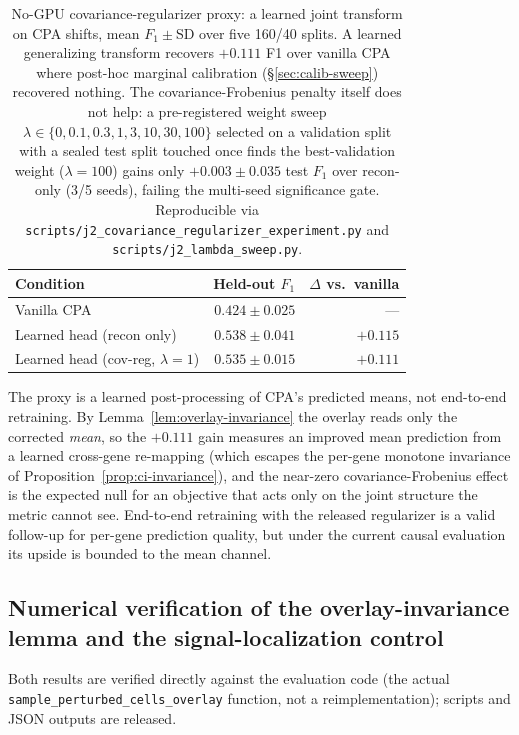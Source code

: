 \documentclass{article}
\theoremstyle{plain}
\theoremstyle{definition}
\theoremstyle{remark}
\begin{document}
\begin{table}[h]
\centering
\small
\begin{tabular}{lrr}
\toprule
\textbf{Condition} & \textbf{Held-out $F_1$} & \textbf{$\Delta$ vs.\ vanilla} \\
\midrule
Vanilla CPA              & $0.424 \pm 0.025$ & --- \\
Learned head (recon only) & $0.538 \pm 0.041$ & $+0.115$ \\
Learned head (cov-reg, $\lambda{=}1$) & $0.535 \pm 0.015$ & $+0.111$ \\
\bottomrule
\end{tabular}
\caption{No-GPU covariance-regularizer proxy: a learned joint transform on CPA shifts, mean $F_1\pm$SD over five 160/40 splits. A learned generalizing transform recovers $+0.111$ F1 over vanilla CPA where post-hoc marginal calibration (\S\ref{sec:calib-sweep}) recovered nothing. The covariance-Frobenius penalty itself does not help: a pre-registered weight sweep $\lambda\in\{0,0.1,0.3,1,3,10,30,100\}$ selected on a validation split with a sealed test split touched once finds the best-validation weight ($\lambda{=}100$) gains only $+0.003\pm0.035$ test $F_1$ over recon-only (3/5 seeds), failing the multi-seed significance gate. Reproducible via \texttt{scripts/j2\_covariance\_regularizer\_experiment.py} and \texttt{scripts/j2\_lambda\_sweep.py}.}
\label{tab:j2}
\end{table}

The proxy is a learned post-processing of CPA's predicted means, not end-to-end retraining. By Lemma~\ref{lem:overlay-invariance} the overlay reads only the corrected \emph{mean}, so the $+0.111$ gain measures an improved mean prediction from a learned cross-gene re-mapping (which escapes the per-gene monotone invariance of Proposition~\ref{prop:ci-invariance}), and the near-zero covariance-Frobenius effect is the expected null for an objective that acts only on the joint structure the metric cannot see. End-to-end retraining with the released regularizer is a valid follow-up for per-gene prediction quality, but under the current causal evaluation its upside is bounded to the mean channel.

\subsection{Numerical verification of the overlay-invariance lemma and the signal-localization control}
\label{app:overlay-invariance}
Both results are verified directly against the evaluation code (the actual \texttt{sample\_perturbed\_cells\_overlay} function, not a reimplementation); scripts and JSON outputs are released.
\end{document}
